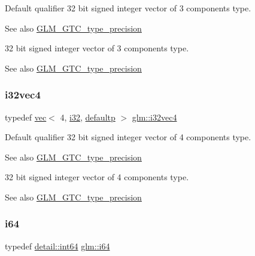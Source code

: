 Default qualifier 32 bit signed integer vector of 3 components type. \begin{DoxySeeAlso}{See also}
\mbox{\hyperlink{group__gtc__type__precision}{G\+L\+M\+\_\+\+G\+T\+C\+\_\+type\+\_\+precision}}
\end{DoxySeeAlso}
32 bit signed integer vector of 3 components type. \begin{DoxySeeAlso}{See also}
\mbox{\hyperlink{group__gtc__type__precision}{G\+L\+M\+\_\+\+G\+T\+C\+\_\+type\+\_\+precision}} 
\end{DoxySeeAlso}
\mbox{\label{group__gtc__type__precision_ga78c16dde5527264e8085b375efba6f28}} 
\subsubsection{\texorpdfstring{i32vec4}{i32vec4}}
{\footnotesize\ttfamily typedef \mbox{\hyperlink{structglm_1_1vec}{vec}}$<$ 4, \mbox{\hyperlink{group__gtc__type__precision_ga1d8ed5c43e91ea7d4528389da4fa9524}{i32}}, \mbox{\hyperlink{namespaceglm_a36ed105b07c7746804d7fdc7cc90ff25a9d21ccd8b5a009ec7eb7677befc3bf51}{defaultp}} $>$ \mbox{\hyperlink{group__gtc__type__precision_ga78c16dde5527264e8085b375efba6f28}{glm\+::i32vec4}}}

Default qualifier 32 bit signed integer vector of 4 components type. \begin{DoxySeeAlso}{See also}
\mbox{\hyperlink{group__gtc__type__precision}{G\+L\+M\+\_\+\+G\+T\+C\+\_\+type\+\_\+precision}}
\end{DoxySeeAlso}
32 bit signed integer vector of 4 components type. \begin{DoxySeeAlso}{See also}
\mbox{\hyperlink{group__gtc__type__precision}{G\+L\+M\+\_\+\+G\+T\+C\+\_\+type\+\_\+precision}} 
\end{DoxySeeAlso}
\mbox{\label{group__gtc__type__precision_gac7a7eaad46064fc952b06df33689da23}} 
\subsubsection{\texorpdfstring{i64}{i64}}
{\footnotesize\ttfamily typedef \mbox{\hyperlink{namespaceglm_1_1detail_a5b1c3227ec636c24a0676746381adfc8}{detail\+::int64}} \mbox{\hyperlink{group__gtc__type__precision_gac7a7eaad46064fc952b06df33689da23}{glm\+::i64}}}

